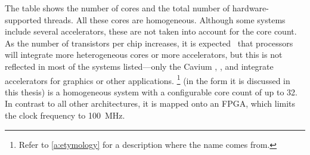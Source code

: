 
The table shows the number of cores and the total number of hardware-supported threads.
All these cores are homogeneous.
Although some systems include several accelerators, these are not taken into account for the core count.
As the number of transistors per chip increases, it is expected~\cite{borkar:future} that processors will integrate more heterogeneous cores or more accelerators, but this is not reflected in most of the systems listed---only the Cavium \OCTEON, \Freescale, and \Exynos integrate accelerators for graphics or other applications.
\Starburst*\footnote{Refer to \cref{a:etymology} for a description where the name comes from.} (in the form it is discussed in this thesis) is a homogeneous \MicroBlaze* system with a configurable core count of up to 32.
In contrast to all other architectures, it is mapped onto an \ac{FPGA}, which limits the clock frequency to \SI{100}{\mega\hertz}.

